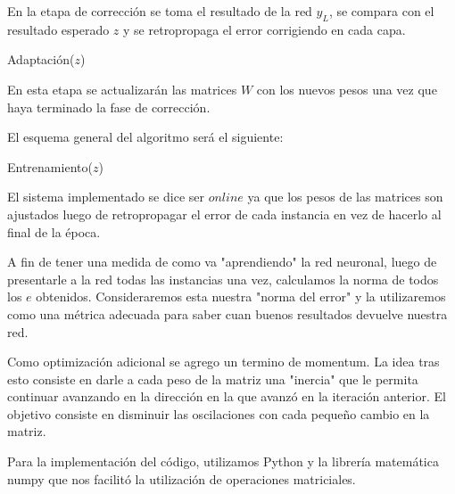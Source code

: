 En la etapa de corrección se toma el resultado de la red $y_L$, se compara con el resultado esperado $z$ y se retropropaga el error corrigiendo en cada capa.

\begin{algorithm}[h!]
\begin{algorithmic}[1]\parskip=1mm
 \caption{Adaptación($z$)}
\end{algorithmic}
\end{algorithm}

En esta etapa se actualizarán las matrices $W$ con los nuevos pesos una vez que haya terminado la fase de corrección.

El esquema general del algoritmo será el siguiente:

\begin{algorithm}[h!]
\begin{algorithmic}[1]\parskip=1mm
 \caption{Entrenamiento($z$)}
\end{algorithmic}
\end{algorithm}

El sistema implementado se dice ser $online$ ya que los pesos de las matrices son ajustados luego de retropropagar el error de cada instancia en vez de hacerlo al final de la época.

A fin de tener una medida de como va "aprendiendo" la red neuronal, luego de presentarle a la red todas las instancias una vez, calculamos la norma de todos los $e$ obtenidos. Consideraremos esta nuestra "norma del error" y la utilizaremos como una métrica adecuada para saber cuan buenos resultados devuelve nuestra red.



Como optimización adicional se agrego un termino de momentum. La idea tras esto consiste en darle a cada peso de la matriz una "inercia" que le permita continuar avanzando en la dirección en la que avanzó en la iteración anterior. El objetivo consiste en disminuir las oscilaciones con cada pequeño cambio en la matriz.

Para la implementación del código, utilizamos Python y la librería matemática numpy que nos facilitó la utilización de operaciones matriciales. 

